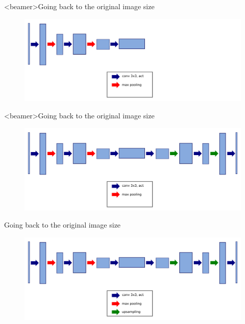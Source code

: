 \documentclass[xcolor=pdftex,dvipsnames,table,mathserif]{beamer}
\begin{document}
\begin{frame}<beamer>{Going back to the original image size}

    \begin{figure}
      \includegraphics[width=\textwidth]{going_back1.png}
    \end{figure}

\end{frame}


\begin{frame}<beamer>{Going back to the original image size}

    \begin{figure}
      \includegraphics[width=\textwidth]{going_back2.png}
    \end{figure}

\end{frame}


\begin{frame}{Going back to the original image size}

    \begin{figure}
      \includegraphics[width=\textwidth]{going_back.png}
    \end{figure}

\end{frame}
\end{document}
